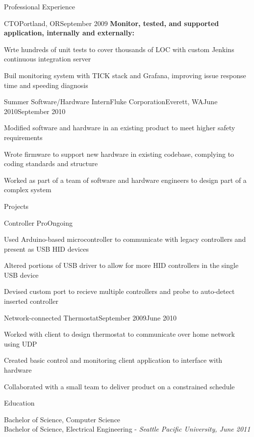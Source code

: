 \documentclass[letterpaper,10pt]{article}
\let\pt\pasttense
\let\anon\anonno
\begin{document}
\begin{res_section}{Professional Experience}
\begin{res_experienceitem}{CTO}{\anon{SERPs.com}{SaaSCo}}{Portland, OR}{September 2009}{{\pt[Present]{March 2017}}}
      \nonitem \textbf{Monitor\pt{ed}, tested, and supported application, internally and externally:}
      \item Wr\pt[i]{o}te hundreds of unit tests to cover thousands of LOC with custom Jenkins continuous integration server
      \item Buil\pt[d]{t} monitoring system with TICK stack and Grafana, improving issue response time and speeding diagnosis
    \end{res_experienceitem}
    \begin{res_experienceitem}{Summer Software/Hardware Intern}{Fluke Corporation}{Everett, WA}{June 2010}{September 2010}
      \item Modified software and hardware in an existing product to meet higher safety requirements
      \item Wrote firmware to support new hardware in existing codebase, complying to coding standards and structure
      \item Worked as part of a team of software and hardware engineers to design part of a complex system
    \end{res_experienceitem}
\end{res_section}
\begin{res_section}{Projects}
    \begin{res_experienceitem}{Controller Pro}{}{}{Ongoing}{}
        \item Used Arduino-based microcontroller to communicate with legacy controllers and present as USB HID devices
        \item Altered portions of USB driver to allow for more HID controllers in the single USB device
        \item Devised custom port to recieve multiple controllers and probe to auto-detect inserted controller
    \end{res_experienceitem}
    \begin{res_experienceitem}{Network-connected Thermostat}{}{}{September 2009}{June 2010}
        \item Worked with client to design thermostat to communicate over home network using UDP
        \item Created basic control and monitoring client application to interface with hardware
        \item Collaborated with a small team to deliver product on a constrained schedule
    \end{res_experienceitem}
\end{res_section}

\begin{res_section}{Education}
\begin{res_content}{Bachelor of Science, Computer Science\\
Bachelor of Science, Electrical Engineering - \em{Seattle Pacific University, June 2011}
}
\end{res_content}
\end{res_section}
\end{document}
